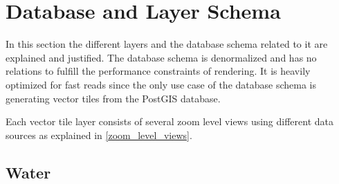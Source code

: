 \newpage
\section{Database and Layer Schema}\label{database-schema}

In this section the different layers and the database schema related to it are explained and justified. The database schema is denormalized and has no relations to fulfill the performance constraints of rendering.
It is heavily optimized for fast reads since the only use case of the database schema is generating vector tiles from the PostGIS database.

Each vector tile layer consists of several zoom level views using different data sources as explained in \autoref{zoom_level_views}.

\subsection{Water}


